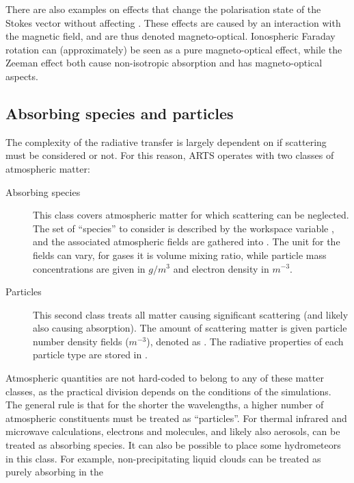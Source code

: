 There are also examples on effects that change the polarisation state of the
Stokes vector without affecting \StoI. These effects are caused by an
interaction with the magnetic field, and are thus denoted magneto-optical.
Ionospheric Faraday rotation can (approximately) be seen as a pure
magneto-optical effect, while the Zeeman effect both cause non-isotropic
absorption and has magneto-optical aspects.



\subsection{Absorbing species and particles}
\label{sec:rteq:absspecies}

The complexity of the radiative transfer is largely dependent on if scattering
must be considered or not. For this reason, ARTS operates with two classes of
atmospheric matter:
\begin{description}
\item[Absorbing species] This class covers atmospheric matter for which
  scattering can be neglected. The set of ``species'' to consider is described
  by the workspace variable , and the associated
  atmospheric fields are gathered into . The unit
  for the fields can vary, for gases it is volume mixing ratio, while
  particle mass concentrations are given in $g/m^3$ and electron density in
  $m^{-3}$.
\item[Particles] This second class treats all matter causing significant
  scattering (and likely also causing absorption). The amount of scattering
  matter is given particle number density fields ($m^{-3}$), denoted as
  . The radiative properties of each particle type are
  stored in .
\end{description}
Atmospheric quantities are not hard-coded to belong to any of these matter
classes, as the practical division depends on the conditions of the
simulations. The general rule is that for the shorter the wavelengths, a higher
number of atmospheric constituents must be treated as ``particles''. For
thermal infrared and microwave calculations, electrons and molecules, and
likely also aerosols, can be treated as absorbing species. It can also be
possible to place some hydrometeors in this class. For example,
non-precipitating liquid clouds can be treated as purely absorbing in the

